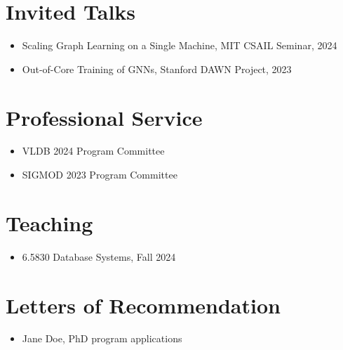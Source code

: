 \documentclass{article}
\begin{document}
\section*{Invited Talks}
\begin{itemize}
\item Scaling Graph Learning on a Single Machine, MIT CSAIL Seminar, 2024
\item Out-of-Core Training of GNNs, Stanford DAWN Project, 2023
\end{itemize}

\section*{Professional Service}
\begin{itemize}
\item VLDB 2024 Program Committee
\item SIGMOD 2023 Program Committee
\end{itemize}

\section*{Teaching}
\begin{itemize}
\item 6.5830 Database Systems, Fall 2024
\end{itemize}

\section*{Letters of Recommendation}
\begin{itemize}
\item Jane Doe, PhD program applications
\end{itemize}
\end{document}
